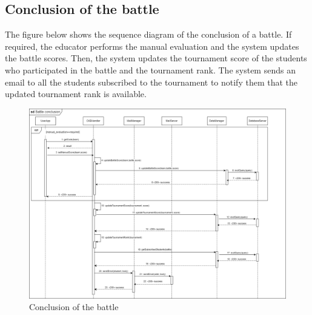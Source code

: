 \subsection{Conclusion of the battle}
The figure below shows the sequence diagram of the conclusion of a battle. If required, the educator performs the manual evaluation and
the system updates the battle scores. Then, the system updates the tournament score of the students who participated in the battle and 
the tournament rank. The system sends an email to all the students subscribed to the tournament to notify them that the updated tournament 
rank is available.\\
\begin{figure}[H]
    \centering
    \includegraphics[width=1\textwidth]{images/seq_diagrams/battle_conclusion_DD.png}
    \caption{Conclusion of the battle}
\end{figure}
\clearpage

